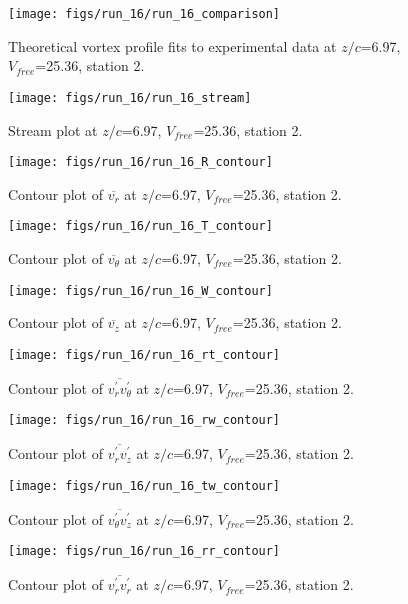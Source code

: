 \begin{figure}[H]
\centering
\texttt{[image: figs/run\_16/run\_16\_comparison]}
\caption{Theoretical vortex profile fits to experimental data at $z/c$=6.97, $V_{free}$=25.36, station 2.}
\end{figure}


\begin{figure}[H]
\centering
\texttt{[image: figs/run\_16/run\_16\_stream]}
\caption{Stream plot at $z/c$=6.97, $V_{free}$=25.36, station 2.}
\end{figure}


\begin{figure}[H]
\centering
\texttt{[image: figs/run\_16/run\_16\_R\_contour]}
\caption{Contour plot of $\overline{v_{r}}$ at $z/c$=6.97, $V_{free}$=25.36, station 2.}
\end{figure}


\begin{figure}[H]
\centering
\texttt{[image: figs/run\_16/run\_16\_T\_contour]}
\caption{Contour plot of $\overline{v_{\theta}}$ at $z/c$=6.97, $V_{free}$=25.36, station 2.}
\end{figure}


\begin{figure}[H]
\centering
\texttt{[image: figs/run\_16/run\_16\_W\_contour]}
\caption{Contour plot of $\overline{v_{z}}$ at $z/c$=6.97, $V_{free}$=25.36, station 2.}
\end{figure}


\begin{figure}[H]
\centering
\texttt{[image: figs/run\_16/run\_16\_rt\_contour]}
\caption{Contour plot of $\overline{v_{r}^{\prime} v_{\theta}^{\prime}}$ at $z/c$=6.97, $V_{free}$=25.36, station 2.}
\end{figure}


\begin{figure}[H]
\centering
\texttt{[image: figs/run\_16/run\_16\_rw\_contour]}
\caption{Contour plot of $\overline{v_{r}^{\prime} v_{z}^{\prime}}$ at $z/c$=6.97, $V_{free}$=25.36, station 2.}
\end{figure}


\begin{figure}[H]
\centering
\texttt{[image: figs/run\_16/run\_16\_tw\_contour]}
\caption{Contour plot of $\overline{v_{\theta}^{\prime} v_{z}^{\prime}}$ at $z/c$=6.97, $V_{free}$=25.36, station 2.}
\end{figure}


\begin{figure}[H]
\centering
\texttt{[image: figs/run\_16/run\_16\_rr\_contour]}
\caption{Contour plot of $\overline{v_{r}^{\prime} v_{r}^{\prime}}$ at $z/c$=6.97, $V_{free}$=25.36, station 2.}
\end{figure}


